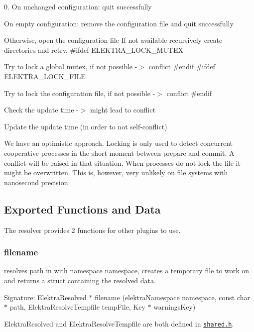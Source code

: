 0. On unchanged configuration\+: quit successfully
\begin{DoxyEnumerate}
\item On empty configuration\+: remove the configuration file and quit successfully
\item Otherwise, open the configuration file If not available recursively create directories and retry. \#ifdef E\+L\+E\+K\+T\+R\+A\+\_\+\+L\+O\+C\+K\+\_\+\+M\+U\+T\+EX
\item Try to lock a global mutex, if not possible -\/$>$ conflict \#endif \#ifdef E\+L\+E\+K\+T\+R\+A\+\_\+\+L\+O\+C\+K\+\_\+\+F\+I\+LE
\item Try to lock the configuration file, if not possible -\/$>$ conflict \#endif
\item Check the update time -\/$>$ might lead to conflict
\item Update the update time (in order to not self-\/conflict)
\end{DoxyEnumerate}

We have an optimistic approach. Locking is only used to detect concurrent cooperative processes in the short moment between prepare and commit. A conflict will be raised in that situation. When processes do not lock the file it might be overwritten. This is, however, very unlikely on file systems with nanosecond precision.

\subsection*{Exported Functions and Data}

The resolver provides 2 functions for other plugins to use.

\subsubsection*{filename}

resolves {\ttfamily path} in with namespace {\ttfamily namespace}, creates a temporary file to work on and returns a struct containing the resolved data.

Signature\+: {\ttfamily Elektra\+Resolved $\ast$ filename (elektra\+Namespace namespace, const char $\ast$ path, Elektra\+Resolve\+Tempfile temp\+File, Key $\ast$ warnings\+Key)}

{\ttfamily Elektra\+Resolved} and {\ttfamily Elektra\+Resolve\+Tempfile} are both defined in \href{/home/markus/Projekte/Elektra/current/src/plugins/resolver/shared.h}{\tt shared.\+h}.

